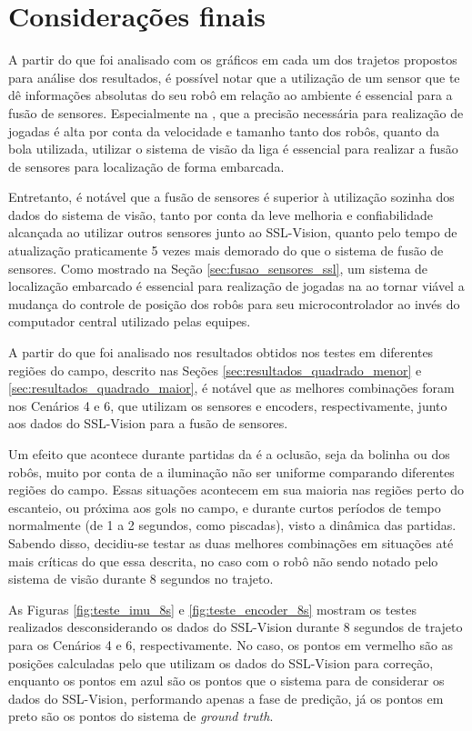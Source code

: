 \documentclass[acronym, symbols, table, deposito]{fei}
\begin{document}
	\section{Considerações finais}
	
		A partir do que foi analisado com os gráficos em cada um dos trajetos propostos para análise dos resultados, é possível notar que a utilização de um sensor que te dê informações absolutas do seu robô em relação ao ambiente é essencial para a fusão de sensores. Especialmente na , que a precisão necessária para realização de jogadas é alta por conta da velocidade e tamanho tanto dos robôs, quanto da bola utilizada, utilizar o sistema de visão da liga é essencial para realizar a fusão de sensores para localização de forma embarcada.
		
		Entretanto, é notável que a fusão de sensores é superior à utilização sozinha dos dados do sistema de visão, tanto por conta da leve melhoria e confiabilidade alcançada ao utilizar outros sensores junto ao SSL-Vision, quanto pelo tempo de atualização praticamente 5 vezes mais demorado do que o sistema de fusão de sensores. Como mostrado na Seção \ref{sec:fusao_sensores_ssl}, um sistema de localização embarcado é essencial para realização de jogadas na  ao tornar viável a mudança do controle de posição dos robôs para seu microcontrolador ao invés do computador central utilizado pelas equipes.
		
		A partir do que foi analisado nos resultados obtidos nos testes em diferentes regiões do campo, descrito nas Seções \ref{sec:resultados_quadrado_menor} e \ref{sec:resultados_quadrado_maior}, é notável que as melhores combinações foram nos Cenários 4 e 6, que utilizam os sensores  e encoders, respectivamente, junto aos dados do SSL-Vision para a fusão de sensores.
		
		Um efeito que acontece durante partidas da  é a oclusão, seja da bolinha ou dos robôs, muito por conta de a iluminação não ser uniforme comparando diferentes regiões do campo. Essas situações acontecem em sua maioria nas regiões perto do escanteio, ou próxima aos gols no campo, e durante curtos períodos de tempo normalmente (de 1 a 2 segundos, como piscadas), visto a dinâmica das partidas. Sabendo disso, decidiu-se testar as duas melhores combinações em situações até mais críticas do que essa descrita, no caso com o robô não sendo notado pelo sistema de visão durante 8 segundos no trajeto.
		
		As Figuras \ref{fig:teste_imu_8s} e \ref{fig:teste_encoder_8s} mostram os testes realizados desconsiderando os dados do SSL-Vision durante 8 segundos de trajeto para os Cenários 4 e 6, respectivamente. No caso, os pontos em vermelho são as posições calculadas pelo  que utilizam os dados do SSL-Vision para correção, enquanto os pontos em azul são os pontos que o sistema para de considerar os dados do SSL-Vision, performando apenas a fase de predição, já os pontos em preto são os pontos do sistema de \textit{ground truth}.
		
\end{document}
